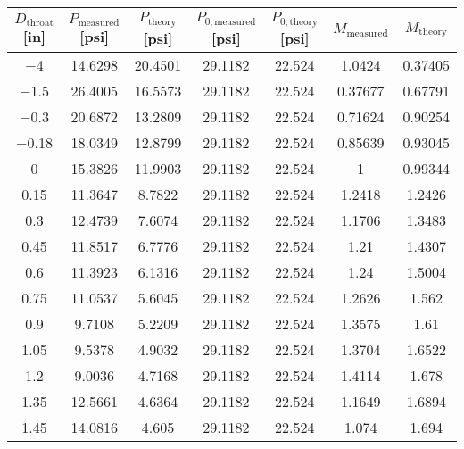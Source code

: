\begin{tabular}{ccccccc}
\toprule
$D_\text{throat}$ [\unit{in}] & $P_\text{measured}$ [\unit{psi}] & $P_\text{theory}$ [\unit{psi}] & $P_{0,\text{measured}}$ [\unit{psi}] & $P_{0,\text{theory}}$ [\unit{psi}] & $M_\text{measured}$ & $M_\text{theory}$ \\
\midrule
\num{-4} & \num{14.6298} & \num{20.4501} & \num{29.1182} & \num{22.524} & \num{1.0424} & \num{0.37405} \\ 
\num{-1.5} & \num{26.4005} & \num{16.5573} & \num{29.1182} & \num{22.524} & \num{0.37677} & \num{0.67791} \\ 
\num{-0.3} & \num{20.6872} & \num{13.2809} & \num{29.1182} & \num{22.524} & \num{0.71624} & \num{0.90254} \\ 
\num{-0.18} & \num{18.0349} & \num{12.8799} & \num{29.1182} & \num{22.524} & \num{0.85639} & \num{0.93045} \\ 
\num{0} & \num{15.3826} & \num{11.9903} & \num{29.1182} & \num{22.524} & \num{1} & \num{0.99344} \\ 
\num{0.15} & \num{11.3647} & \num{8.7822} & \num{29.1182} & \num{22.524} & \num{1.2418} & \num{1.2426} \\ 
\num{0.3} & \num{12.4739} & \num{7.6074} & \num{29.1182} & \num{22.524} & \num{1.1706} & \num{1.3483} \\ 
\num{0.45} & \num{11.8517} & \num{6.7776} & \num{29.1182} & \num{22.524} & \num{1.21} & \num{1.4307} \\ 
\num{0.6} & \num{11.3923} & \num{6.1316} & \num{29.1182} & \num{22.524} & \num{1.24} & \num{1.5004} \\ 
\num{0.75} & \num{11.0537} & \num{5.6045} & \num{29.1182} & \num{22.524} & \num{1.2626} & \num{1.562} \\ 
\num{0.9} & \num{9.7108} & \num{5.2209} & \num{29.1182} & \num{22.524} & \num{1.3575} & \num{1.61} \\ 
\num{1.05} & \num{9.5378} & \num{4.9032} & \num{29.1182} & \num{22.524} & \num{1.3704} & \num{1.6522} \\ 
\num{1.2} & \num{9.0036} & \num{4.7168} & \num{29.1182} & \num{22.524} & \num{1.4114} & \num{1.678} \\ 
\num{1.35} & \num{12.5661} & \num{4.6364} & \num{29.1182} & \num{22.524} & \num{1.1649} & \num{1.6894} \\ 
\num{1.45} & \num{14.0816} & \num{4.605} & \num{29.1182} & \num{22.524} & \num{1.074} & \num{1.694} \\ 
\bottomrule
\end{tabular}